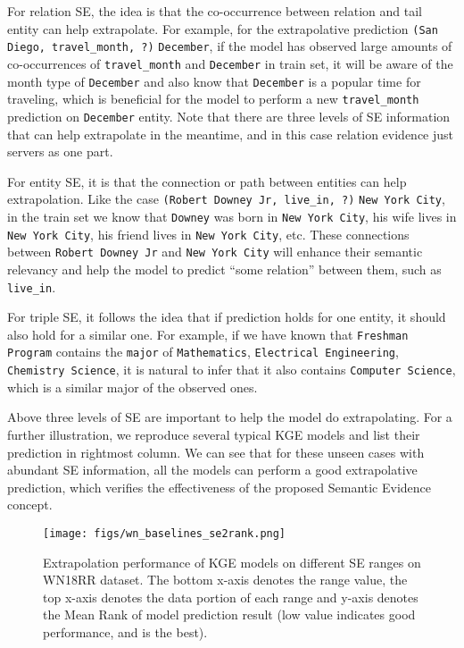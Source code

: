 \documentclass[letterpaper]{article} \usepackage{aaai22}  \usepackage{times}  \usepackage{helvet}  \usepackage{courier}  \usepackage[hyphens]{url}  \usepackage{graphicx} \urlstyle{rm} \def\UrlFont{\rm}  \usepackage{natbib}  \usepackage{caption} \DeclareCaptionStyle{ruled}{labelfont=normalfont,labelsep=colon,strut=off} \frenchspacing  \setlength{\pdfpagewidth}{8.5in}  \setlength{\pdfpageheight}{11in}  \usepackage{algorithm}
\begin{document}
For relation SE, the idea is that the co-occurrence between relation and tail entity can help extrapolate. For example, for the extrapolative prediction \texttt{(San Diego, travel\_month, ?)}  \texttt{December}, if the model has observed large amounts of co-occurrences of \texttt{travel\_month} and \texttt{December} in train set, it will be aware of the month type of \texttt{December} and also know that \texttt{December} is a popular time for traveling, which is beneficial for the model to perform a new \texttt{travel\_month} prediction on \texttt{December} entity. Note that there are three levels of SE information that can help extrapolate in the meantime, and in this case relation evidence just servers as one part. 

For entity SE, it is that the connection or path between entities can help extrapolation. Like the case \texttt{(Robert Downey Jr, live\_in, ?)}  \texttt{New York City}, in the train set we know that \texttt{Downey} was born in \texttt{New York City}, his wife lives in \texttt{New York City}, his friend lives in \texttt{New York City}, etc. These connections between \texttt{Robert Downey Jr} and \texttt{New York City} will enhance their semantic relevancy and help the model to predict ``some relation'' between them, such as \texttt{live\_in}. 

For triple SE, it follows the idea that if prediction holds for one entity, it should also hold for a similar one. For example, if we have known that \texttt{Freshman Program} contains the \texttt{major} of \texttt{Mathematics}, \texttt{Electrical Engineering}, \texttt{Chemistry Science}, it is natural to infer that it also contains \texttt{Computer Science}, which is a similar major of the observed ones. 

Above three levels of SE are important to help the model do extrapolating. For a further illustration, we reproduce several typical KGE models and list their prediction in rightmost column. We can see that for these unseen cases with abundant SE information, all the models can perform a good extrapolative prediction, which verifies the effectiveness of the proposed Semantic Evidence concept.


\begin{figure*}
    \centering 
    \texttt{[image: figs/wn\_baselines\_se2rank.png]} 
    \caption{Extrapolation performance of KGE models on different SE ranges on WN18RR dataset. The bottom x-axis denotes the range value, the top x-axis denotes the data portion of each range and y-axis denotes the Mean Rank of model prediction result (low value indicates good performance, and  is the best).} 
    \label{fig: wn_baselines_se2rank}
\end{figure*}
\end{document}
